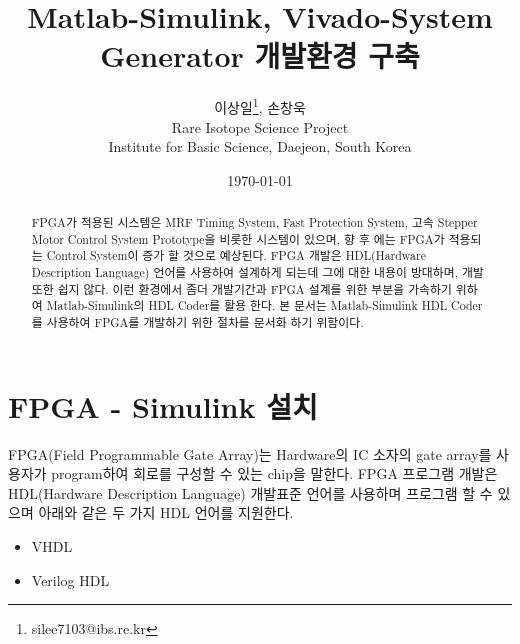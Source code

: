 \documentclass[11pt
  , a4paper
  , article
  , oneside
]{memoir}
\begin{document}
\newcommand{\technumber}{
  RAON Control-Document Series\\
  Revision : v1.0,   Release : 2015-03-16 fixed date}
\title{\textbf{Matlab-Simulink, Vivado-System Generator 개발환경 구축}}

\author{이상일\thanks{silee7103@ibs.re.kr}, 손창욱 \\

  Rare Isotope Science Project\\
  Institute for Basic Science, Daejeon, South Korea
}
\date{\today}
\renewcommand{\maketitlehooka}{\begin{flushright}\textsf{\technumber}\end{flushright}}

\maketitle

\begin{abstract}
FPGA가 적용된 시스템은 MRF Timing System, Fast Protection System, 고속 Stepper Motor Control System Prototype을 비롯한 시스템이 있으며, 향 후 에는 FPGA가 적용되는 Control System이 증가 할 것으로 예상된다. FPGA 개발은 HDL(Hardware Description Language) 언어를 사용하여 설계하게 되는데 그에 대한 내용이 방대하며, 개발 또한 쉽지 않다. 
이런 환경에서 좀더 개발기간과 FPGA 설계를 위한 부분을 가속하기 위하여 Matlab-Simulink의 HDL Coder를 활용 한다. 본 문서는 Matlab-Simulink HDL Coder를 사용하여 FPGA를 개발하기 위한 절차를 문서화 하기 위함이다.
\end{abstract}

\clearpage

\chapter{FPGA - Simulink 설치}
FPGA(Field Programmable Gate Array)는 Hardware의 IC 소자의 gate array를 사용자가 program하여 회로를 구성할 수 있는 chip을 말한다. FPGA 프로그램 개발은 HDL(Hardware Description Language) 개발표준 언어를 사용하며 프로그램 할 수 있으며 아래와 같은 두 가지 HDL 언어를 지원한다.

\begin{itemize}
	\item VHDL
	\item Verilog HDL
\end{itemize}
\end{document}

